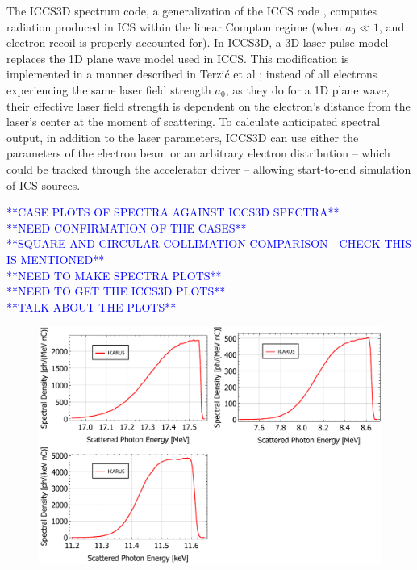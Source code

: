 \documentclass[../main.tex]{subfiles}
\begin{document}
The \textsc{ICCS3D} spectrum code, a generalization of the \textsc{ICCS} code \cite{krafft2016laser,ranjan2018simulation}, computes radiation produced in ICS within the linear Compton regime (when $a_{0}\ll 1$, and electron recoil is properly accounted for). In \textsc{ICCS3D}, a 3D laser pulse model replaces the 1D plane wave model used in \textsc{ICCS}. This modification is implemented in a manner described in Terzi\'c et al \cite{terzic2019improving}; instead of all electrons experiencing the same laser field strength $a_{0}$, as they do for a 1D plane wave, their effective laser field strength is dependent on the electron's distance from the laser's center at the moment of scattering. To calculate anticipated spectral output, in addition to the laser parameters, \textsc{ICCS3D} can use either the parameters of the electron beam or an arbitrary electron distribution -- which could be tracked through the accelerator driver -- allowing start-to-end simulation of ICS sources. 

\textcolor{blue}{**CASE PLOTS OF SPECTRA AGAINST ICCS3D SPECTRA** \\ **NEED CONFIRMATION OF THE CASES** \\ **SQUARE AND CIRCULAR COLLIMATION COMPARISON - CHECK THIS IS MENTIONED** \\ **NEED TO MAKE SPECTRA PLOTS** \\ **NEED TO GET THE ICCS3D PLOTS** \\ **TALK ABOUT THE PLOTS**}

\begin{figure}[!h]
\centering
\includegraphics[width=\textwidth]{Figures/Optimisation_and_Characterisation_of_Inverse_Compton_Scattering_Sources/ICARUS_optimised_benchmark.pdf}
\caption{}
\label{fig:ICARUS_optimised_benchmarking}
\end{figure}
\end{document}

